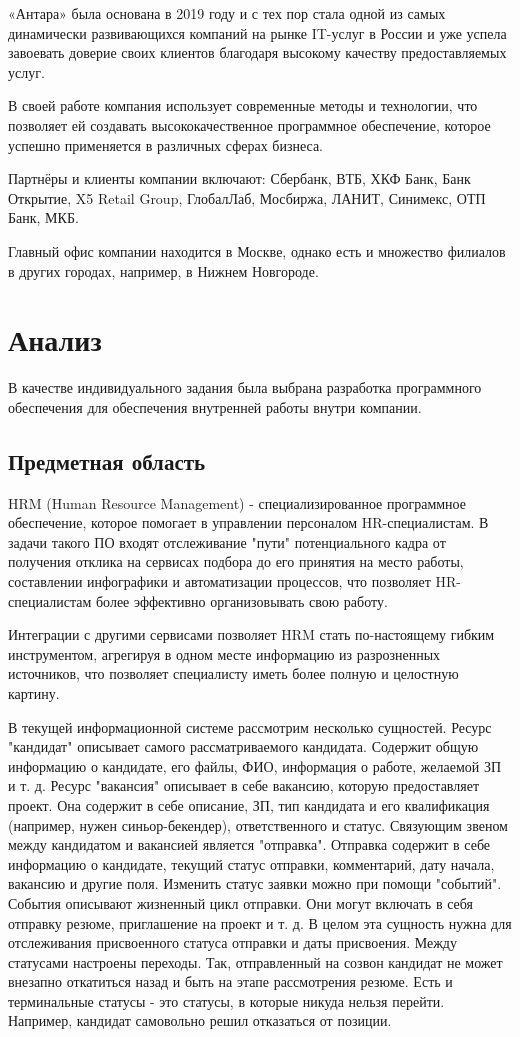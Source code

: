 \documentclass[a4paper,14pt]{extarticle}
\begin{document}
«Антара» была основана в 2019 году и с тех пор стала одной из самых динамически развивающихся 
компаний на рынке IT-услуг в России и уже успела завоевать доверие своих клиентов благодаря 
высокому качеству предоставляемых услуг.

В своей работе компания использует современные методы и технологии, что позволяет ей создавать 
высококачественное программное обеспечение, которое успешно применяется в различных сферах бизнеса.

Партнёры и клиенты компании включают: Сбербанк, ВТБ, ХКФ Банк, Банк Открытие, X5 Retail Group, ГлобалЛаб, Мосбиржа, ЛАНИТ, Синимекс, ОТП Банк, МКБ.

Главный офис компании находится в Москве, однако есть и множество филиалов в других городах, например, 
в Нижнем Новгороде.
\section{Анализ}
В качестве индивидуального задания была выбрана разработка программного обеспечения
для обеспечения внутренней работы внутри компании.
\subsection{Предметная область}
HRM (Human Resource Management) - специализированное программное обеспечение, которое 
помогает в управлении персоналом HR-специалистам. В задачи такого ПО входят отслеживание 
"пути" потенциального кадра от получения отклика на сервисах подбора
до его принятия на место работы, составлении инфографики и автоматизации процессов, 
что позволяет HR-специалистам более эффективно организовывать свою работу.

Интеграции с другими сервисами позволяет HRM стать по-настоящему гибким инструментом, 
агрегируя в одном месте информацию из разрозненных источников, что позволяет специалисту
иметь более полную и целостную картину. 

В текущей информационной системе рассмотрим несколько сущностей. 
Ресурс "кандидат" описывает самого рассматриваемого кандидата. Содержит общую информацию о кандидате, 
его файлы, ФИО, информация о работе, желаемой ЗП и т. д.
Ресурс "вакансия" описывает в себе вакансию, которую предоставляет проект. Она содержит в себе описание, 
ЗП, тип кандидата и его квалификация (например, нужен синьор-бекендер), ответственного и статус. 
Связующим звеном между кандидатом и вакансией является "отправка". Отправка содержит в себе информацию о кандидате, 
текущий статус отправки, комментарий, дату начала, вакансию и другие поля.
Изменить статус заявки можно при помощи "событий". События описывают жизненный цикл отправки. Они могут включать 
в себя отправку резюме, приглашение на проект и т. д. В целом эта сущность нужна для отслеживания присвоенного статуса 
отправки и даты присвоения. Между статусами настроены переходы. Так, отправленный на созвон кандидат не может внезапно 
откатиться назад и быть на этапе рассмотрения резюме. Есть и терминальные статусы - это статусы, в которые 
никуда нельзя перейти. Например, кандидат самовольно решил отказаться от позиции. 
\end{document}
